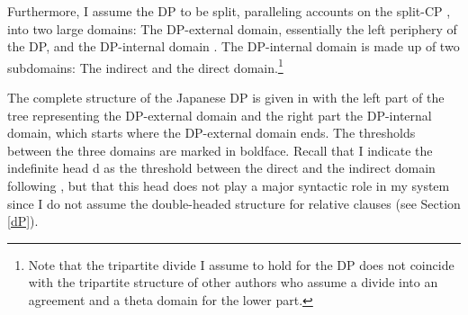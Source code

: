 Furthermore, I assume the DP to be split, paralleling accounts on the split-CP \citep{rizzi:1997:the, grohmann:2003:prolific, laenzlinger:2011:elements}, into two large domains: The DP-external domain, essentially the left periphery of the DP, and the DP-internal domain \citep{kiss:1998:identificational, kiss:2007:topic, giusti:1996:is, dimitrova:1998:fragments, ihsane:2001:specific, aboh:2004:topic, aboh:2006:when, laenzlinger:2005:french, kim:2019:syntax}. The DP-internal domain is made up of two subdomains: The indirect and the direct domain.\footnote{Note that the tripartite divide I assume to hold for the DP does not coincide with the tripartite structure of other authors \citep{laenzlinger:2011:elements, grohmann:2003:prolific} who assume a divide into an agreement and a theta domain for the lower part.}

The complete structure of the Japanese DP is given in  with the left part of the tree representing the DP-external domain and the right part the DP-internal domain, which starts where the DP-external domain ends. The thresholds between the three domains are marked in boldface. Recall that I indicate the indefinite head d as the threshold between the direct and the indirect domain following \citet{cinque:2010:adj, cinque:2020:relcl}, but that this head does not play a major syntactic role in my system since I do not assume the double-headed structure for relative clauses (see Section \ref{dP}).

